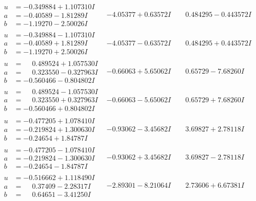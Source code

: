\documentclass[1p]{elsarticle_modified}
\theoremstyle{definition}
\begin{document}
$$\begin{array}{c|c|c}
\begin{aligned}
u &= -0.349884 + 1.107310 I \\
a &= -0.40589 - 1.81289 I \\
b &= -1.19270 - 2.50026 I\end{aligned}
 & -4.05377 + 0.63572 I & \phantom{-}0.484295 - 0.443572 I \\ \hline\begin{aligned}
u &= -0.349884 - 1.107310 I \\
a &= -0.40589 + 1.81289 I \\
b &= -1.19270 + 2.50026 I\end{aligned}
 & -4.05377 - 0.63572 I & \phantom{-}0.484295 + 0.443572 I \\ \hline\begin{aligned}
u &= \phantom{-}0.489524 + 1.057530 I \\
a &= \phantom{-}0.323550 - 0.327963 I \\
b &= -0.560466 - 0.804802 I\end{aligned}
 & -0.66063 + 5.65062 I & \phantom{-}0.65729 - 7.68260 I \\ \hline\begin{aligned}
u &= \phantom{-}0.489524 - 1.057530 I \\
a &= \phantom{-}0.323550 + 0.327963 I \\
b &= -0.560466 + 0.804802 I\end{aligned}
 & -0.66063 - 5.65062 I & \phantom{-}0.65729 + 7.68260 I \\ \hline\begin{aligned}
u &= -0.477205 + 1.078410 I \\
a &= -0.219824 + 1.300630 I \\
b &= -0.24654 + 1.84787 I\end{aligned}
 & -0.93062 - 3.45682 I & \phantom{-}3.69827 + 2.78118 I \\ \hline\begin{aligned}
u &= -0.477205 - 1.078410 I \\
a &= -0.219824 - 1.300630 I \\
b &= -0.24654 - 1.84787 I\end{aligned}
 & -0.93062 + 3.45682 I & \phantom{-}3.69827 - 2.78118 I \\ \hline\begin{aligned}
u &= -0.516662 + 1.118490 I \\
a &= \phantom{-}0.37409 - 2.28317 I \\
b &= \phantom{-}0.64651 - 3.41250 I\end{aligned}
 & -2.89301 - 8.21064 I & \phantom{-}2.73606 + 6.67381 I \\ \hline\begin{aligned}

\end{aligned}
\end{array}$$
\end{document}
